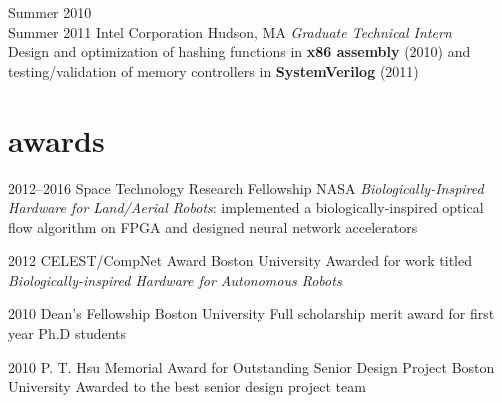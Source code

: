 \documentclass[]{friggeri-cv} %
\begin{document}

\begin{entrylist}


\entry
{Summer 2010\\Summer 2011}
{Intel Corporation}
{Hudson, MA}
{\emph{Graduate Technical Intern} \\
  Design and optimization of hashing functions in \textbf{x86 assembly} (2010) and testing/validation of memory controllers in \textbf{SystemVerilog} (2011)
}


\end{entrylist}


\section{awards}

\begin{entrylist}


\entry
{2012--2016}
{Space Technology Research Fellowship}
{NASA}
{\emph{Biologically-Inspired Hardware for Land/Aerial Robots}: implemented a biologically-inspired optical flow algorithm on FPGA and designed neural network accelerators}

\entry
{2012}
{CELEST/CompNet Award}
{Boston University}
{Awarded for work titled \emph{Biologically-inspired Hardware for Autonomous Robots}}

\entry
{2010}
{Dean's Fellowship}
{Boston University}
{Full scholarship merit award for first year Ph.D students}

\entry
{2010}
{P. T. Hsu Memorial Award for Outstanding Senior Design Project}
{Boston University}
{Awarded to the best senior design project team}



\end{entrylist}
\end{document}
